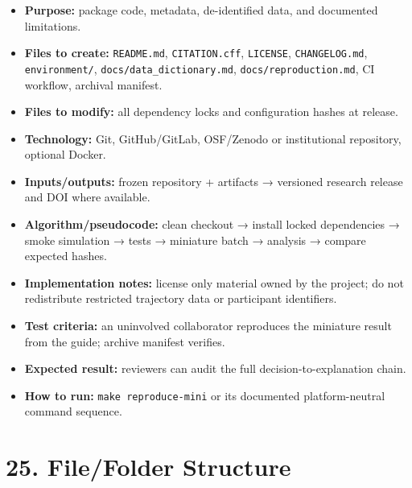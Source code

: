 \documentclass[
  english,
  11pt,
  a4paper,
]{article}
\providecommand{\tightlist}{%
  \setlength{\itemsep}{0pt}\setlength{\parskip}{0pt}}
\begin{document}
\begin{itemize}
\tightlist
\item
  \textbf{Purpose:} package code, metadata, de-identified data, and
  documented limitations.
\item
  \textbf{Files to create:} \texttt{README.md}, \texttt{CITATION.cff},
  \texttt{LICENSE}, \texttt{CHANGELOG.md}, \texttt{environment/},
  \texttt{docs/data\_dictionary.md}, \texttt{docs/reproduction.md}, CI
  workflow, archival manifest.
\item
  \textbf{Files to modify:} all dependency locks and configuration
  hashes at release.
\item
  \textbf{Technology:} Git, GitHub/GitLab, OSF/Zenodo or institutional
  repository, optional Docker.
\item
  \textbf{Inputs/outputs:} frozen repository + artifacts → versioned
  research release and DOI where available.
\item
  \textbf{Algorithm/pseudocode:} clean checkout → install locked
  dependencies → smoke simulation → tests → miniature batch → analysis →
  compare expected hashes.
\item
  \textbf{Implementation notes:} license only material owned by the
  project; do not redistribute restricted trajectory data or participant
  identifiers.
\item
  \textbf{Test criteria:} an uninvolved collaborator reproduces the
  miniature result from the guide; archive manifest verifies.
\item
  \textbf{Expected result:} reviewers can audit the full
  decision-to-explanation chain.
\item
  \textbf{How to run:} \texttt{make\ reproduce-mini} or its documented
  platform-neutral command sequence.
\end{itemize}

\section{25. File/Folder Structure}\label{filefolder-structure}
\end{document}
